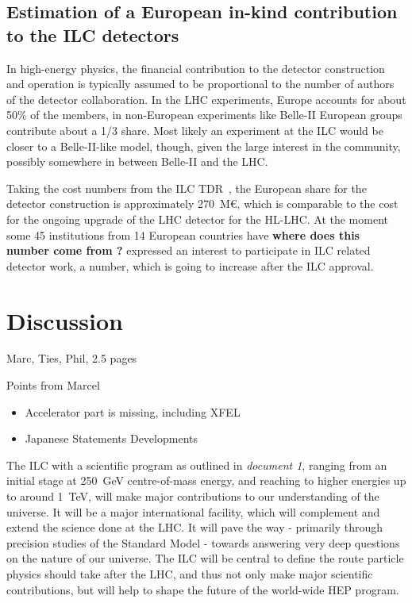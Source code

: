\documentclass[%
 reprint,
 amsmath,amssymb,
 aps,
]{revtex4-1}
\begin{document}
\subsection{\label{Section:constructionmodel:ILCDet} Estimation of a
European in-kind contribution to the ILC detectors}

In high-energy physics, the financial contribution to the detector
construction and operation is typically assumed to be proportional to the number of authors of
the detector collaboration. In the LHC experiments, Europe accounts for about 50\% of the members, 
in non-European experiments like Belle-II European groups contribute about a 1/3 share. Most likely 
an experiment at the ILC would be closer to a Belle-II-like model, though, given the large interest 
in the community, possibly somewhere in between Belle-II and the LHC. 

Taking the cost numbers from the ILC TDR~\cite{Behnke:2013lya}, the European share for the detector construction 
is approximately 270~M\euro{}, which is comparable to the cost for the ongoing upgrade of the LHC detector for the HL-LHC. 
At the moment some 45 institutions from 14 European countries have {\bfseries where does this number come from ?} expressed 
an interest to participate in ILC related detector work, a number, which is going to increase after the ILC approval.

\section{\label{sec:discussion}Discussion}

Marc, Ties, Phil, 2.5 pages

Points from Marcel
\begin{itemize}
    \item Accelerator part is missing, including XFEL
    \item Japanese Statements Developments
\end{itemize}




The ILC with a scientific program as outlined in {\it document 1}, ranging from 
an initial stage at 250~GeV centre-of-mass energy, and reaching to higher 
energies up to around 1~TeV, will make major contributions to our understanding 
of the universe. It will be a major international facility, which will 
complement and extend the science done at the LHC. It will pave the way - 
primarily through precision studies of the Standard Model - towards answering 
very deep questions on the nature of our universe. The ILC will be central to 
define the route particle physics should take after the LHC, and thus not only 
make major scientific contributions, but will help to shape the future of the 
world-wide HEP program. 
\end{document}
